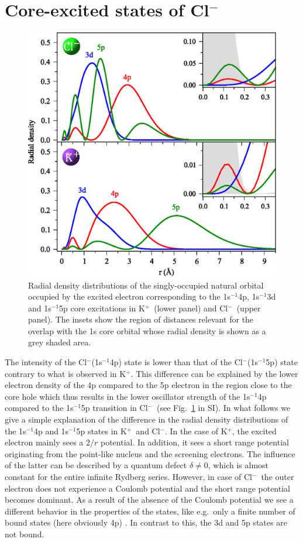 \documentclass[journal=jpclcd,manuscript=letter]{achemso}
\newcommand{\cli}{Cl$^{-}$}
\newcommand{\ki}{K$^{+}$}
\begin{document}
\section{Core-excited states of Cl$^{-}$}
\begin{figure}[h!]
\centering
\includegraphics[scale=0.8]{figures/rad_dens_kcl.eps}
\caption{Radial density distributions of the singly-occupied natural orbital occupied by the excited electron corresponding to the 1s$^{-1}$4p, 1s$^{-1}$3d and 1s$^{-1}$5p core excitations in \ki~(lower panel) and \cli~(upper panel). The insets show the region of distances relevant for the overlap with the 1s core orbital whose radial density is shown as a grey shaded area.}
\label{fg:si_rdens_ions}
\end{figure}
%
%
The intensity of the Cl$^{-}$(1s$^{-1}$4p) state is lower than that of the \cli(1s$^{-1}$5p) state contrary to what is observed in \ki. This difference can be explained by the lower electron density of the 4p compared to the 5p electron in the region close to the core hole which thus results in the lower oscillator strength of the 1s$^{-1}$4p compared to the 1s$^{-1}$5p transition in \cli~(see Fig.\ \ref{fg:si_rdens_ions} in SI).
In what follows we give a simple explanation of the difference in the radial density distributions of the 1s$^{-1}$4p and 1s$^{-1}$5p states in \ki~and \cli. In the case of \ki, the excited electron mainly sees a $2/r$ potential. In addition, it sees a short range potential originating from the point-like nucleus and the screening electrons. The influence of the latter can be described by a quantum defect $\delta \ne 0$, which is almost constant for the entire infinite Rydberg series. However, in case of \cli~the outer electron does not experience a Coulomb potential and the short range potential becomes dominant. As a result of the absence of the Coulomb potential we see a different behavior in the properties of the states, like e.g.\ only a finite number of bound states (here obviously 4p) \citep{buckman94:539}. In contrast to this, the 3d and 5p states are not bound. %
\end{document}
